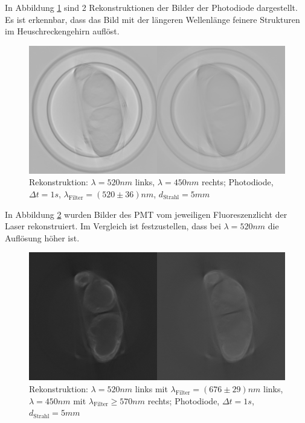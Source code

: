 \begin{minipage}{\linewidth}
In Abbildung \ref{fig:both-pht} sind 2 Rekonstruktionen der Bilder der Photodiode dargestellt.
Es ist erkennbar, dass das Bild mit der längeren Wellenlänge feinere Strukturen im Heuschreckengehirn auflöst.
\begin{figure}[H]
\centering
\includegraphics[width=\linewidth]{IMAGE/2-pht.png}
\caption{Rekonstruktion: $\lambda = 520 \si{nm}$ links, $\lambda = 450 \si{nm}$ rechts; Photodiode, $\Delta{t} = 1 \si{s}$, $\lambda_\text{Filter} = (520 \pm 36) \si{nm}$, $d_\text{Strahl} = 5 \si{mm}$}
	\label{fig:both-pht}
\end{figure}

In Abbildung \ref{fig:both-pmt} wurden Bilder des PMT vom jeweiligen Fluoreszenzlicht der Laser rekonstruiert. Im Vergleich ist festzustellen, dass bei $\lambda= 520 \si{nm}$ die Auflösung höher ist.

\begin{figure}[H]
\centering
\includegraphics[width=\linewidth]{IMAGE/2-pmt.png}
\caption{Rekonstruktion: $\lambda = 520 \si{nm}$ links mit $\lambda_\text{Filter} = (676 \pm 29) \si{nm}$ links,\\
$\lambda = 450 \si{nm}$ mit $\lambda_\text{Filter} \ge 570 \si{nm}$ rechts; Photodiode, $\Delta{t} = 1 \si{s}$,\\
$d_\text{Strahl} = 5 \si{mm}$}
	\label{fig:both-pmt}
\end{figure}
\end{minipage}

